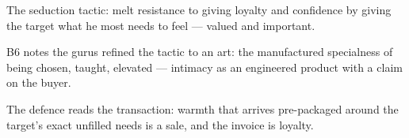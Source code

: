 

\begin{distilled}
  \item The seduction tactic: melt resistance to giving loyalty and confidence by giving the target what he most needs to feel --- valued and important.
  \item B6 notes the gurus refined the tactic to an art: the manufactured specialness of being chosen, taught, elevated --- intimacy as an engineered product with a claim on the buyer.
  \item The defence reads the transaction: warmth that arrives pre-packaged around the target's exact unfilled needs is a sale, and the invoice is loyalty.
\end{distilled}
